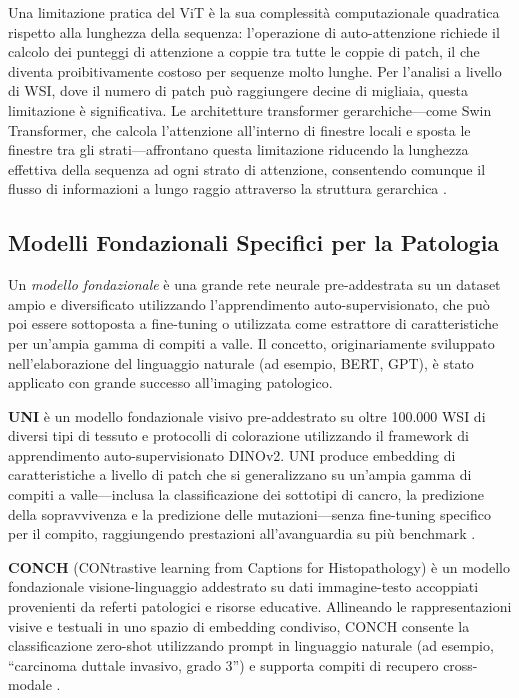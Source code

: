 Una limitazione pratica del ViT è la sua complessità computazionale quadratica rispetto alla lunghezza della sequenza: l'operazione di auto-attenzione richiede il calcolo dei punteggi di attenzione a coppie tra tutte le coppie di patch, il che diventa proibitivamente costoso per sequenze molto lunghe. Per l'analisi a livello di WSI, dove il numero di patch può raggiungere decine di migliaia, questa limitazione è significativa. Le architetture transformer gerarchiche---come Swin Transformer, che calcola l'attenzione all'interno di finestre locali e sposta le finestre tra gli strati---affrontano questa limitazione riducendo la lunghezza effettiva della sequenza ad ogni strato di attenzione, consentendo comunque il flusso di informazioni a lungo raggio attraverso la struttura gerarchica \cite{xu2024}.

\subsection{Modelli Fondazionali Specifici per la Patologia}

Un \emph{modello fondazionale} è una grande rete neurale pre-addestrata su un dataset ampio e diversificato utilizzando l'apprendimento auto-supervisionato, che può poi essere sottoposta a fine-tuning o utilizzata come estrattore di caratteristiche per un'ampia gamma di compiti a valle. Il concetto, originariamente sviluppato nell'elaborazione del linguaggio naturale (ad esempio, BERT, GPT), è stato applicato con grande successo all'imaging patologico.

\textbf{UNI} è un modello fondazionale visivo pre-addestrato su oltre 100.000 WSI di diversi tipi di tessuto e protocolli di colorazione utilizzando il framework di apprendimento auto-supervisionato DINOv2. UNI produce embedding di caratteristiche a livello di patch che si generalizzano su un'ampia gamma di compiti a valle---inclusa la classificazione dei sottotipi di cancro, la predizione della sopravvivenza e la predizione delle mutazioni---senza fine-tuning specifico per il compito, raggiungendo prestazioni all'avanguardia su più benchmark \cite{wang2024}.

\textbf{CONCH} (CONtrastive learning from Captions for Histopathology) è un modello fondazionale visione-linguaggio addestrato su dati immagine-testo accoppiati provenienti da referti patologici e risorse educative. Allineando le rappresentazioni visive e testuali in uno spazio di embedding condiviso, CONCH consente la classificazione zero-shot utilizzando prompt in linguaggio naturale (ad esempio, ``carcinoma duttale invasivo, grado 3'') e supporta compiti di recupero cross-modale \cite{wang2024}.

